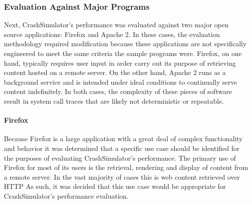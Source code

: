         \subsubsection{Evaluation Against Major Programs}

            Next, CrashSimulator's performance was evaluated against two major open source applications: Firefox and
            Apache 2. In these cases, the evaluation methodology required modification because these applications are
            not specifically engineered to meet the same criteria the sample programs were. Firefox, on one hand,
            typically requires user input in order carry out its purpose of retrieving content hosted on a remote
            server. On the other hand, Apache 2 runs as a background service and is intended under ideal conditions to
            continually serve content indefinitely. In both cases, the complexity of these pieces of software result in
            system call traces that are likely not deterministic or repeatable.

            \paragraph{Firefox}

                Because Firefox is a large application with a great deal of complex functionality and behavior it was
                determined that a specific use case should be identified for the purposes of evaluating CrashSimulator's
                performance. The primary use of Firefox for most of its users is the retrieval, rendering and display of
                content from a remote server. In the vast majority of cases this is web content retrieved over HTTP As
                such, it was decided that this use case would be appropriate for CrashSimulator's performance
                evaluation.

